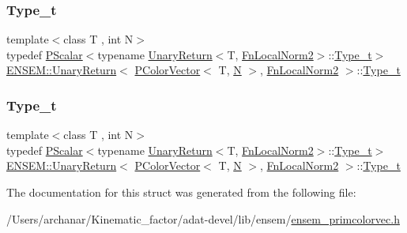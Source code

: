\subsubsection{\texorpdfstring{Type\_t}{Type\_t}\hspace{0.1cm}{\footnotesize\ttfamily [2/3]}}
{\footnotesize\ttfamily template$<$class T , int N$>$ \\
typedef \mbox{\hyperlink{classENSEM_1_1PScalar}{P\+Scalar}}$<$typename \mbox{\hyperlink{structENSEM_1_1UnaryReturn}{Unary\+Return}}$<$T, \mbox{\hyperlink{structENSEM_1_1FnLocalNorm2}{Fn\+Local\+Norm2}}$>$\+::\mbox{\hyperlink{structENSEM_1_1UnaryReturn_3_01PColorVector_3_01T_00_01N_01_4_00_01FnLocalNorm2_01_4_ae0b040392de6e5320e94c74d9578abb8}{Type\+\_\+t}}$>$ \mbox{\hyperlink{structENSEM_1_1UnaryReturn}{E\+N\+S\+E\+M\+::\+Unary\+Return}}$<$ \mbox{\hyperlink{classENSEM_1_1PColorVector}{P\+Color\+Vector}}$<$ T, \mbox{\hyperlink{adat__devel_2lib_2hadron_2operator__name__util_8cc_a7722c8ecbb62d99aee7ce68b1752f337}{N}} $>$, \mbox{\hyperlink{structENSEM_1_1FnLocalNorm2}{Fn\+Local\+Norm2}} $>$\+::\mbox{\hyperlink{structENSEM_1_1UnaryReturn_3_01PColorVector_3_01T_00_01N_01_4_00_01FnLocalNorm2_01_4_ae0b040392de6e5320e94c74d9578abb8}{Type\+\_\+t}}}

\mbox{\label{structENSEM_1_1UnaryReturn_3_01PColorVector_3_01T_00_01N_01_4_00_01FnLocalNorm2_01_4_ae0b040392de6e5320e94c74d9578abb8}} 
\subsubsection{\texorpdfstring{Type\_t}{Type\_t}\hspace{0.1cm}{\footnotesize\ttfamily [3/3]}}
{\footnotesize\ttfamily template$<$class T , int N$>$ \\
typedef \mbox{\hyperlink{classENSEM_1_1PScalar}{P\+Scalar}}$<$typename \mbox{\hyperlink{structENSEM_1_1UnaryReturn}{Unary\+Return}}$<$T, \mbox{\hyperlink{structENSEM_1_1FnLocalNorm2}{Fn\+Local\+Norm2}}$>$\+::\mbox{\hyperlink{structENSEM_1_1UnaryReturn_3_01PColorVector_3_01T_00_01N_01_4_00_01FnLocalNorm2_01_4_ae0b040392de6e5320e94c74d9578abb8}{Type\+\_\+t}}$>$ \mbox{\hyperlink{structENSEM_1_1UnaryReturn}{E\+N\+S\+E\+M\+::\+Unary\+Return}}$<$ \mbox{\hyperlink{classENSEM_1_1PColorVector}{P\+Color\+Vector}}$<$ T, \mbox{\hyperlink{adat__devel_2lib_2hadron_2operator__name__util_8cc_a7722c8ecbb62d99aee7ce68b1752f337}{N}} $>$, \mbox{\hyperlink{structENSEM_1_1FnLocalNorm2}{Fn\+Local\+Norm2}} $>$\+::\mbox{\hyperlink{structENSEM_1_1UnaryReturn_3_01PColorVector_3_01T_00_01N_01_4_00_01FnLocalNorm2_01_4_ae0b040392de6e5320e94c74d9578abb8}{Type\+\_\+t}}}



The documentation for this struct was generated from the following file\+:\begin{DoxyCompactItemize}
\item 
/\+Users/archanar/\+Kinematic\+\_\+factor/adat-\/devel/lib/ensem/\mbox{\hyperlink{adat-devel_2lib_2ensem_2ensem__primcolorvec_8h}{ensem\+\_\+primcolorvec.\+h}}\end{DoxyCompactItemize}
